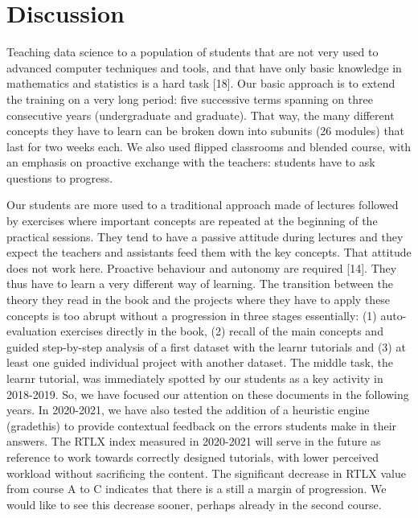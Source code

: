 \documentclass{aims}
\theoremstyle{definition}
\begin{document}
\hypertarget{discussion}{%
\section{Discussion}\label{discussion}}

Teaching data science to a population of students that are not very used
to advanced computer techniques and tools, and that have only basic
knowledge in mathematics and statistics is a hard task {[}18{]}. Our
basic approach is to extend the training on a very long period: five
successive terms spanning on three consecutive years (undergraduate and
graduate). That way, the many different concepts they have to learn can
be broken down into subunits (26 modules) that last for two weeks each.
We also used flipped classrooms and blended course, with an emphasis on
proactive exchange with the teachers: students have to ask questions to
progress.

Our students are more used to a traditional approach made of lectures
followed by exercises where important concepts are repeated at the
beginning of the practical sessions. They tend to have a passive
attitude during lectures and they expect the teachers and assistants
feed them with the key concepts. That attitude does not work here.
Proactive behaviour and autonomy are required {[}14{]}. They thus have
to learn a very different way of learning. The transition between the
theory they read in the book and the projects where they have to apply
these concepts is too abrupt without a progression in three stages
essentially: (1) auto-evaluation exercises directly in the book, (2)
recall of the main concepts and guided step-by-step analysis of a first
dataset with the learnr tutorials and (3) at least one guided individual
project with another dataset. The middle task, the learnr tutorial, was
immediately spotted by our students as a key activity in 2018-2019. So,
we have focused our attention on these documents in the following years.
In 2020-2021, we have also tested the addition of a heuristic engine
(gradethis) to provide contextual feedback on the errors students make
in their answers. The RTLX index measured in 2020-2021 will serve in the
future as reference to work towards correctly designed tutorials, with
lower perceived workload without sacrificing the content. The
significant decrease in RTLX value from course A to C indicates that
there is a still a margin of progression. We would like to see this
decrease sooner, perhaps already in the second course.
\end{document}
